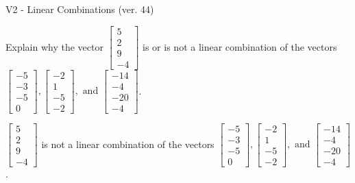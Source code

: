 \begin{exercise}
  \begin{exerciseTitle}V2 - Linear Combinations (ver. 44)\end{exerciseTitle}
  \begin{exerciseStatement}
    Explain why the vector \(\left[\begin{array}{c}
5 \\
2 \\
9 \\
-4
\end{array}\right]\)  is or is not a linear 
	combination of the vectors \(\left[\begin{array}{c}
-5 \\
-3 \\
-5 \\
0
\end{array}\right] , \left[\begin{array}{c}
-2 \\
1 \\
-5 \\
-2
\end{array}\right] , \text{ and } \left[\begin{array}{c}
-14 \\
-4 \\
-20 \\
-4
\end{array}\right]\).
	


  \end{exerciseStatement}
  \begin{exerciseAnswer}
   \(\left[\begin{array}{c}
5 \\
2 \\
9 \\
-4
\end{array}\right]\) 
  	 is not  
	a linear combination of the vectors \(\left[\begin{array}{c}
-5 \\
-3 \\
-5 \\
0
\end{array}\right] , \left[\begin{array}{c}
-2 \\
1 \\
-5 \\
-2
\end{array}\right] , \text{ and } \left[\begin{array}{c}
-14 \\
-4 \\
-20 \\
-4
\end{array}\right]\).

	
  


  \end{exerciseAnswer}
\end{exercise}